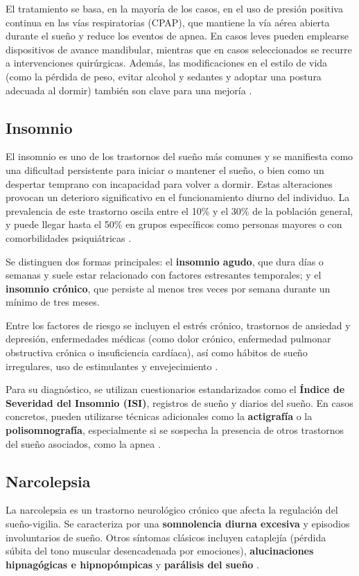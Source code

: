 El tratamiento se basa, en la mayoría de los casos, en el uso de presión positiva continua en las vías respiratorias (CPAP), que mantiene la vía aérea abierta durante el sueño y reduce los eventos de apnea. En casos leves pueden emplearse dispositivos de avance mandibular, mientras que en casos seleccionados se recurre a intervenciones quirúrgicas. Además, las modificaciones en el estilo de vida (como la pérdida de peso, evitar alcohol y sedantes y adoptar una postura adecuada al dormir) también son clave para una mejoría \cite{mayoclinic_apnea}.


\subsection{Insomnio}
El insomnio es uno de los trastornos del sueño más comunes y se manifiesta como una dificultad persistente para iniciar o mantener el sueño, o bien como un despertar temprano con incapacidad para volver a dormir. Estas alteraciones provocan un deterioro significativo en el funcionamiento diurno del individuo. La prevalencia de este trastorno oscila entre el 10\% y el 30\% de la población general, y puede llegar hasta el 50\% en grupos específicos como personas mayores o con comorbilidades psiquiátricas \cite{morin2012chronic}.

Se distinguen dos formas principales: el \textbf{insomnio agudo}, que dura días o semanas y suele estar relacionado con factores estresantes temporales; y el \textbf{insomnio crónico}, que persiste al menos tres veces por semana durante un mínimo de tres meses. 

Entre los factores de riesgo se incluyen el estrés crónico, trastornos de ansiedad y depresión, enfermedades médicas (como dolor crónico, enfermedad pulmonar obstructiva crónica o insuficiencia cardíaca), así como hábitos de sueño irregulares, uso de estimulantes y envejecimiento \cite{ninds_narcolepsy}.

Para su diagnóstico, se utilizan cuestionarios estandarizados como el \textbf{Índice de Severidad del Insomnio (ISI)}, registros de sueño y diarios del sueño. En casos concretos, pueden utilizarse técnicas adicionales como la \textbf{actigrafía} o la \textbf{polisomnografía}, especialmente si se sospecha la presencia de otros trastornos del sueño asociados, como la apnea \cite{ISI}.


\subsection{Narcolepsia}
La narcolepsia es un trastorno neurológico crónico que afecta la regulación del sueño-vigilia. Se caracteriza por una \textbf{somnolencia diurna excesiva} y episodios involuntarios de sueño. Otros síntomas clásicos incluyen cataplejía (pérdida súbita del tono muscular desencadenada por emociones), \textbf{alucinaciones hipnagógicas e hipnopómpicas} y \textbf{parálisis del sueño} \cite{ninds_narcolepsy}.

